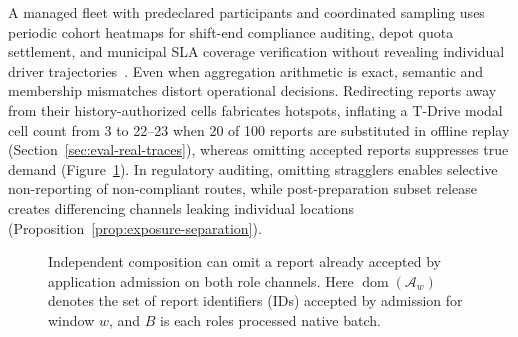 \documentclass[conference,compsoc]{IEEEtran}
\theoremstyle{definition}
\numberwithin{equation}{section}
\numberwithin{table}{section}
\numberwithin{figure}{section}
\theoremstyle{plain}
\begin{document}
A managed fleet with predeclared participants and coordinated sampling uses periodic cohort heatmaps for shift-end compliance auditing, depot quota settlement, and municipal SLA coverage verification without revealing individual driver trajectories~\cite{Popa2011PrivStats,Popa2009VPriv,Balasch2010PrETP}. Even when aggregation arithmetic is exact, semantic and membership mismatches distort operational decisions. Redirecting reports away from their history-authorized cells fabricates hotspots, inflating a T-Drive modal cell count from 3 to 22--23 when 20 of 100 reports are substituted in offline replay (Section~\ref{sec:eval-real-traces}), whereas omitting accepted reports suppresses true demand (Figure~\ref{fig:gap}). In regulatory auditing, omitting stragglers enables selective non-reporting of non-compliant routes, while post-preparation subset release creates differencing channels leaking individual locations (Proposition~\ref{prop:exposure-separation}).
\begin{figure}[t]
\centering
{}
\caption{Independent composition can omit a report already accepted by application admission on both role channels. Here \(\operatorname{dom}(\mathcal A_w)\) denotes the set of report identifiers (IDs) accepted by admission for window \(w\), and \(B\) is each role\textquotesingle s processed native batch.}
\label{fig:gap}
\end{figure}
\end{document}
